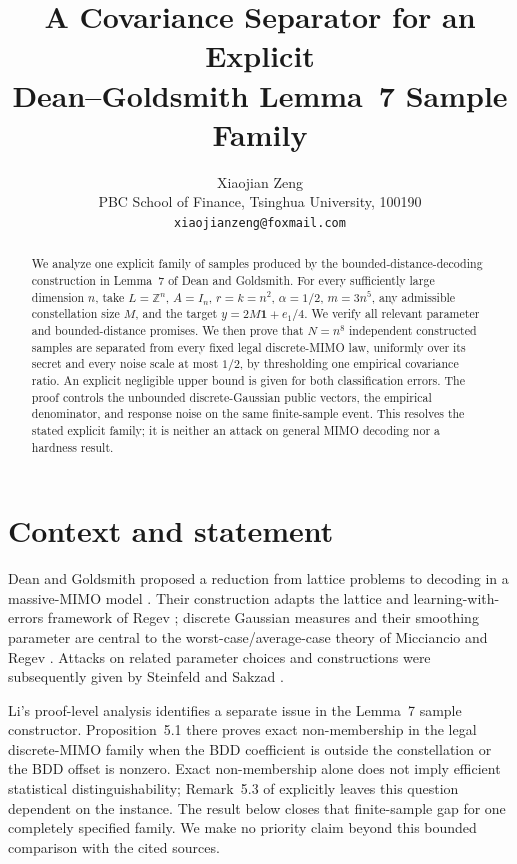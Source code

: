\documentclass[11pt]{article}
\title{A Covariance Separator for an Explicit\\
Dean--Goldsmith Lemma~7 Sample Family}
\author{Xiaojian Zeng\\
PBC School of Finance, Tsinghua University, 100190\\
\texttt{xiaojianzeng@foxmail.com}}
\date{}
\theoremstyle{remark}
\newcommand{\Z}{\mathbb Z}
\newcommand{\one}{\mathbf 1}
\begin{document}
\maketitle

\begin{abstract}
We analyze one explicit family of samples produced by the
bounded-distance-decoding construction in Lemma~7 of Dean and Goldsmith.
For every sufficiently large dimension \(n\), take
\(L=\Z^n\), \(A=I_n\), \(r=k=n^2\), \(\alpha=1/2\),
\(m=3n^5\), any admissible constellation size \(M\), and the target
\(y=2M\one+e_1/4\).  We verify all relevant parameter and
bounded-distance promises.  We then prove that \(N=n^8\) independent
constructed samples are separated from every fixed legal discrete-MIMO
law, uniformly over its secret and every noise scale at most \(1/2\), by
thresholding one empirical covariance ratio.  An explicit negligible
upper bound is given for both classification errors.  The proof controls
the unbounded discrete-Gaussian public vectors, the empirical denominator,
and response noise on the same finite-sample event.  This resolves the
stated explicit family; it is neither an attack on general MIMO decoding
nor a hardness result.
\end{abstract}

\section{Context and statement}

Dean and Goldsmith proposed a reduction from lattice problems to decoding
in a massive-MIMO model \cite{DeanGoldsmith2017}.  Their construction
adapts the lattice and learning-with-errors framework of Regev
\cite{Regev2009}; discrete Gaussian measures and their smoothing
parameter are central to the worst-case/average-case theory of
Micciancio and Regev \cite{MicciancioRegev2007}.  Attacks on related
parameter choices and constructions were subsequently given by Steinfeld
and Sakzad \cite{SteinfeldSakzad2015,SakzadSteinfeld2020}.

Li's proof-level analysis \cite{Li2026} identifies a separate issue in the
Lemma~7 sample constructor.  Proposition~5.1 there proves exact
non-membership in the legal discrete-MIMO family when the BDD coefficient
is outside the constellation or the BDD offset is nonzero.  Exact
non-membership alone does not imply efficient statistical
distinguishability; Remark~5.3 of \cite{Li2026} explicitly leaves this
question dependent on the instance.  The result below closes that
finite-sample gap for one completely specified family.  We make no
priority claim beyond this bounded comparison with the cited sources.
\end{document}
